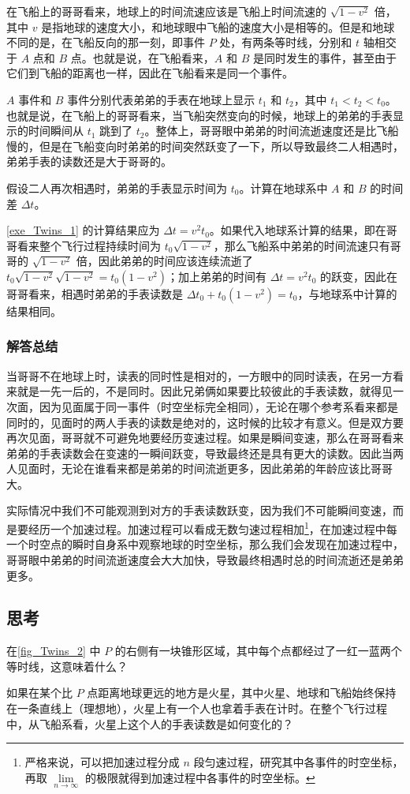 在飞船上的哥哥看来，地球上的时间流速应该是飞船上时间流速的 $\sqrt{1-v^2}$ 倍，其中 $v$ 是指地球的速度大小，和地球眼中飞船的速度大小是相等的。但是和地球不同的是，在飞船反向的那一刻，即事件 $P$ 处，有两条等时线，分别和 $t$ 轴相交于 $A$ 点和 $B$ 点。也就是说，在飞船看来，$A$ 和 $B$ 是同时发生的事件，甚至由于它们到飞船的距离也一样，因此在飞船看来是同一个事件。

$A$ 事件和 $B$ 事件分别代表弟弟的手表在地球上显示 $t_1$ 和 $t_2$，其中 $t_1<t_2<t_0$。也就是说，在飞船上的哥哥看来，当飞船突然变向的时候，地球上的弟弟的手表显示的时间瞬间从 $t_1$ 跳到了 $t_2$。整体上，哥哥眼中弟弟的时间流逝速度还是比飞船慢的，但是在飞船变向时弟弟的时间突然跃变了一下，所以导致最终二人相遇时，弟弟手表的读数还是大于哥哥的。

\begin{exercise}{}\label{exe_Twins_1}
假设二人再次相遇时，弟弟的手表显示时间为 $t_0$。计算在地球系中 $A$ 和 $B$ 的时间差 $\Delta t$。
\end{exercise}

\autoref{exe_Twins_1} 的计算结果应为 $\Delta t=v^2t_0$。如果代入地球系计算的结果，即在哥哥看来整个飞行过程持续时间为 $t_0\sqrt{1-v^2}$，那么飞船系中弟弟的时间流速只有哥哥的 $\sqrt{1-v^2}$ 倍，因此弟弟的时间应该连续流逝了 $t_0\sqrt{1-v^2}\sqrt{1-v^2}=t_0(1-v^2)$；加上弟弟的时间有 $\Delta t=v^2t_0$ 的跃变，因此在哥哥看来，相遇时弟弟的手表读数是 $\Delta t_0+t_0(1-v^2)=t_0$，与地球系中计算的结果相同。

\subsubsection{解答总结}

当哥哥不在地球上时，读表的同时性是相对的，一方眼中的同时读表，在另一方看来就是一先一后的，不是同时。因此兄弟俩如果要比较彼此的手表读数，就得见一次面，因为见面属于同一事件（时空坐标完全相同），无论在哪个参考系看来都是同时的，见面时的两人手表的读数是绝对的，这时候的比较才有意义。但是双方要再次见面，哥哥就不可避免地要经历变速过程。如果是瞬间变速，那么在哥哥看来弟弟的手表读数会在变速的一瞬间跃变，导致最终还是具有更大的读数。因此当两人见面时，无论在谁看来都是弟弟的时间流逝更多，因此弟弟的年龄应该比哥哥大。

实际情况中我们不可能观测到对方的手表读数跃变，因为我们不可能瞬间变速，而是要经历一个加速过程。加速过程可以看成无数匀速过程相加\footnote{严格来说，可以把加速过程分成 $n$ 段匀速过程，研究其中各事件的时空坐标，再取 $\lim\limits_{n\rightarrow\infty}$ 的极限就得到加速过程中各事件的时空坐标。}，在加速过程中每一个时空点的瞬时自身系中观察地球的时空坐标，那么我们会发现在加速过程中，哥哥眼中弟弟的时间流逝速度会大大加快，导致最终相遇时总的时间流逝还是弟弟更多。

\subsection{思考}

在\autoref{fig_Twins_2} 中 $P$ 的右侧有一块锥形区域，其中每个点都经过了一红一蓝两个等时线，这意味着什么？

如果在某个比 $P$ 点距离地球更远的地方是火星，其中火星、地球和飞船始终保持在一条直线上（理想地），火星上有一个人也拿着手表在计时。在整个飞行过程中，从飞船系看，火星上这个人的手表读数是如何变化的？







